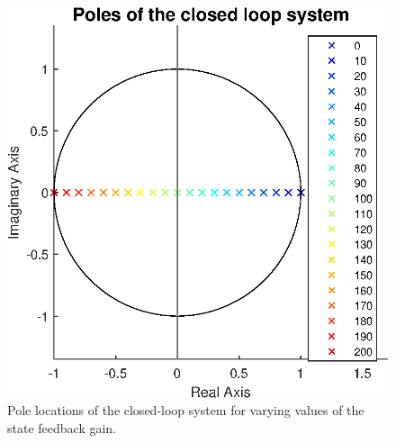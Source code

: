\documentclass[a4paper,kul]{kulakarticle} %
\begin{document}
\begin{figure}[htp!]
	\centering
	\includegraphics[width=0.5\linewidth]{poles.eps}
	\caption{Pole locations of the closed-loop system for varying values of the state feedback gain.}
	\label{fig:poles}
\end{figure}
\end{document}
